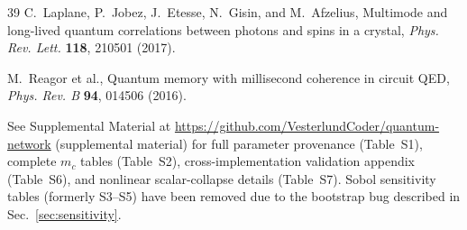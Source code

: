 \documentclass[quantumrep,article,submit,moreauthors]{Definitions/mdpi}
\begin{document}
\begin{thebibliography}{39}
C.~Laplane, P.~Jobez, J.~Etesse, N.~Gisin, and M.~Afzelius,
Multimode and long-lived quantum correlations between photons and spins in a crystal,
\textit{Phys. Rev. Lett.} \textbf{118}, 210501 (2017).

M.~Reagor et al.,
Quantum memory with millisecond coherence in circuit QED,
\textit{Phys. Rev. B} \textbf{94}, 014506 (2016).

See Supplemental Material at \url{https://github.com/VesterlundCoder/quantum-network} (supplemental material) for full parameter provenance (Table~S1), complete $m_c$ tables (Table~S2), cross-implementation validation appendix (Table~S6), and nonlinear scalar-collapse details (Table~S7). Sobol sensitivity tables (formerly S3--S5) have been removed due to the bootstrap bug described in Sec.~\ref{sec:sensitivity}.

\end{thebibliography}
\end{document}
